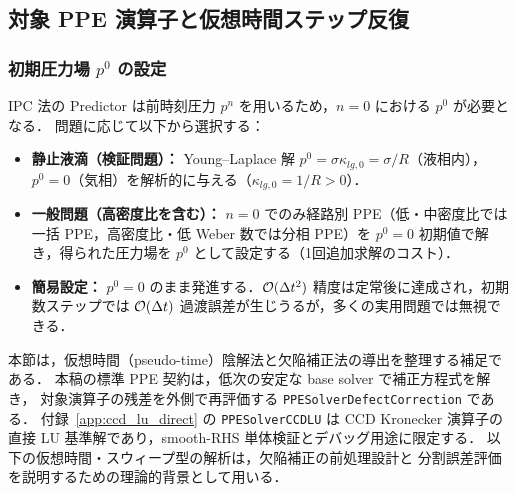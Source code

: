 %
\subsection{対象 PPE 演算子と仮想時間ステップ反復}
\label{sec:ppe_pseudotime}

\subsubsection{\texorpdfstring{初期圧力場 $p^0$ の設定}{初期圧力場 p0 の設定}}
\label{sec:ppe_p0_init}

IPC 法の Predictor は前時刻圧力 $p^n$ を用いるため，$n=0$ における $p^0$ が必要となる．
問題に応じて以下から選択する：
\begin{itemize}
  \item \textbf{静止液滴（検証問題）：} Young--Laplace 解 $p^0 = \sigma\kappa_{lg,0} = \sigma/R$（液相内），$p^0 = 0$（気相）を解析的に与える（$\kappa_{lg,0} = 1/R > 0$）．
  \item \textbf{一般問題（高密度比を含む）：} $n=0$ でのみ経路別 PPE（低・中密度比では一括 PPE，高密度比・低 Weber 数では分相 PPE）を $p^0 = 0$ 初期値で解き，得られた圧力場を $p^0$ として設定する（1回追加求解のコスト）．
  \item \textbf{簡易設定：} $p^0 = 0$ のまま発進する．$\mathcal{O}(\Delta t^2)$ 精度は定常後に達成され，初期数ステップでは $\mathcal{O}(\Delta t)$ 過渡誤差が生じうるが，多くの実用問題では無視できる．
\end{itemize}

\medskip
本節は，仮想時間（pseudo-time）陰解法と欠陥補正法の導出を整理する補足である．
本稿の標準 PPE 契約は，低次の安定な base solver で補正方程式を解き，
対象演算子の残差を外側で再評価する \texttt{PPESolverDefectCorrection} である．
付録~\ref{app:ccd_lu_direct} の \texttt{PPESolverCCDLU} は CCD Kronecker 演算子の
直接 LU 基準解であり，smooth-RHS 単体検証とデバッグ用途に限定する．
以下の仮想時間・スウィープ型の解析は，欠陥補正の前処理設計と
分割誤差評価を説明するための理論的背景として用いる．

